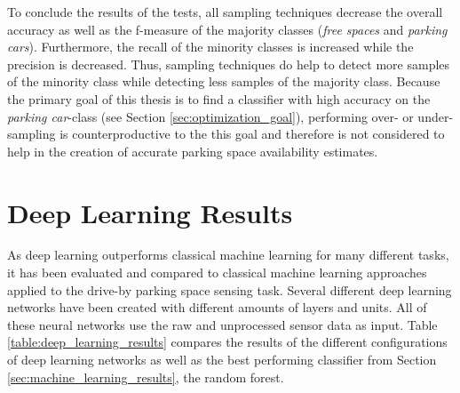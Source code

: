 To conclude the results of the tests, all sampling techniques decrease the overall accuracy as well as the f-measure of the majority classes (\emph{free spaces} and \emph{parking cars}). Furthermore, the recall of the minority classes is increased while the precision is decreased. Thus, sampling techniques do help to detect more samples of the minority class while detecting less samples of the majority class. Because the primary goal of this thesis is to find a classifier with high accuracy on the \emph{parking car}-class (see Section \ref{sec:optimization_goal}), performing over- or under-sampling is counterproductive to the this goal and therefore is not considered to help in the creation of accurate parking space availability estimates.







\section{Deep Learning Results}
\label{sec:deep_learning_results}

As deep learning outperforms classical machine learning for many different tasks, it has been evaluated and compared to classical machine learning approaches applied to the drive-by parking space sensing task. Several different deep learning networks have been created with different amounts of layers and units. All of these neural networks use the raw and unprocessed sensor data as input. Table \ref{table:deep_learning_results} compares the results of the different configurations of deep learning networks as well as the best performing classifier from Section \ref{sec:machine_learning_results}, the random forest. 


